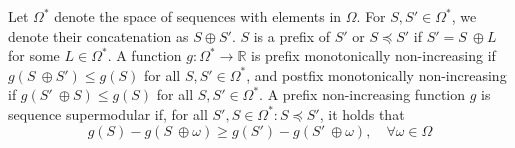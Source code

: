 \documentclass{article}
\begin{document}
Let $\Omega^*$ denote the space of sequences with elements in $\Omega$. For $S, S' \in \Omega^*$, we denote their concatenation as $S \oplus S'$. $S$ is a prefix of $S'$ or $S \preceq S'$ if $S' = S \ \oplus L$ for some $L \in \Omega^*$.
A function $g: \Omega^* \to \mathbb{R}$ is prefix monotonically non-increasing if $g(S \ \oplus S') \leq g(S)$ for all $S, S' \in \Omega^*$, and postfix monotonically non-increasing if $g(S' \ \oplus S) \leq g(S)$ for all $S, S' \in \Omega^*$. A prefix non-increasing function $g$ is sequence supermodular if, for all $S', S \in \Omega^*: S \preceq S'$, it holds that
\begin{equation}\label{eqn:supermod}
    g(S) - g(S \ \oplus \omega ) \geq g(S') - g(S' \ \oplus \omega ), \quad \forall \omega \in \Omega
\end{equation}
\end{document}
